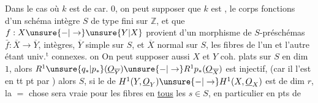 Dans le cas où $k$ est de car. $0$, on
peut supposer que $k$ est , le corps  fonctions d'un
schéma intègre $S$ de type fini sur $\mathbb Z$,
et que $f:X\unsure{-|\to}\unsure{Y|X}$ provient d'un
morphisme de $S$-préschémas $\bar f:\overline X\to\overline Y$,
intègres, $\overline Y$ simple sur $S$, et $\overline X$ 
normal sur $S$, les fibres de l'un et
l'autre étant univ.$^{\mathrm t}$ connexes.  on
 On peut
supposer aussi $X$ et $Y$ coh. plats sur
$S$ en dim $1$,  alors
  $R^1\unsure{q_*|p_*}(\underline{O}_{\overline Y})\unsure{-|\to} R^1p_*(\underline{O}_{\overline X})$ est injectif,
 (car il l'est en tt pt
par ) alors  $S$, si
le  de $H^1(Y,\underline{O}_Y)\unsure{-|\to}H^1(X,\underline{O}_X)$
est de dim $r$, la $=$ chose sera
vraie pour les fibres en \uline{tous} les  
$s\in S$, en particulier en  pts de
